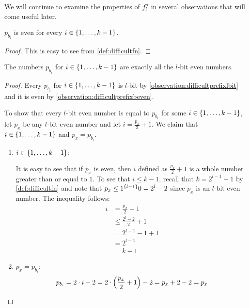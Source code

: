 We will continue to examine the properties of $f_l^n$
in several observations that will come useful later.

\begin{observation}
\label{observation:difficultprefixbeven}
$p_{b_i}$ is even
for every $i \in \curly{1, \ldots, k-1}$.
\end{observation}

\begin{proof}
This is easy to see from \cref{def:difficultfn}.
\end{proof}

\begin{observation}
\label{observation:difficultpreifxbevenequiv}
The numbers $p_{b_i}$ for $i \in \curly{1, \ldots, k-1}$
are exactly
all the $l$-bit even numbers.
\end{observation}

\begin{proof}
\hfill
{}
Every $p_{b_i}$ for $i \in \curly{1, \ldots, k-1}$
is $l$-bit by \cref{observation:difficultprefixlbit}
and it is even
by \cref{observation:difficultprefixbeven}.

To show that every $l$-bit even number
is equal to $p_{b_i}$
for some $i \in \curly{1, \ldots, k-1}$,
let $p_x$ be any $l$-bit even number
and let $i = \frac{p_x}{2} + 1$.
We claim that $i \in \curly{1, \ldots, k-1}$
and $p_x = p_{b_i}$.

\begin{enumerate}
\item $i \in \curly{1, \ldots, k-1}$:

It is easy to see that
if $p_x$ is even,
then $i$ defined as $\frac{p_x}{2} + 1$
is a whole number greater than or equal to $1$.
To see that $i \leq k-1$,
recall that $k = 2^{l-1} + 1$ by \cref{def:difficultfn}
and note that $p_x \leq \rep{1}{l-1} 0 = 2^l-2$
since $p_x$ is an $l$-bit even number.
The inequality follows:
\begin{align*}
i
&= \frac{p_x}{2} + 1 \\
&\leq \frac{2^l-2}{2} + 1 \\
&= 2^{l-1} - 1 + 1 \\
&= 2^{l-1} \\
&= k - 1
\end{align*}

\item $p_x = p_{b_i}$:
$$
p_{b_i}
= 2 \cdot i - 2
= 2 \cdot \round*{\frac{p_x}{2} + 1} - 2
= p_x + 2 - 2
= p_x
$$
\end{enumerate}
\end{proof}

